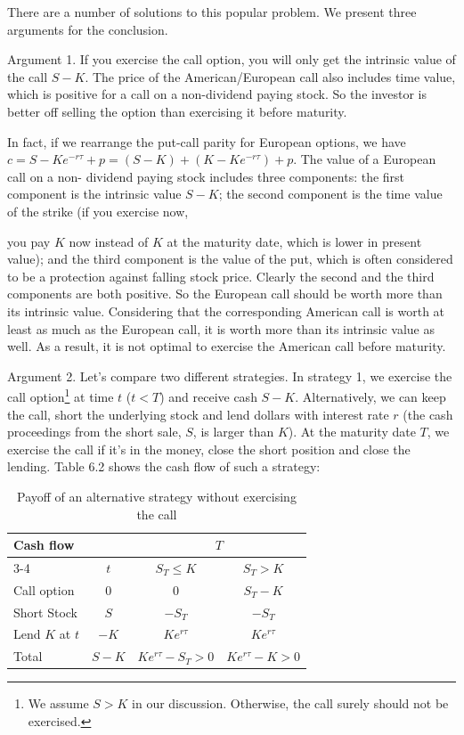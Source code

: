 \begin{solution}
There are a number of solutions to this popular problem. We present three arguments for
the conclusion.

Argument 1. If you exercise the call option, you will only get the intrinsic value of the
call $S-K$. The price of the American/European call also includes time value, which is
positive for a call on a non-dividend paying stock. So the investor is better off selling the
option than exercising it before maturity.

In fact, if we rearrange the put-call parity for European options, we have
$c=S-Ke^{-r\tau}+p=(S-K)+(K-Ke^{-r\tau})+p$. The value of a European call on a non-
dividend paying stock includes three components: the first component is the intrinsic
value $S-K$; the second component is the time value of the strike (if you exercise now,

you pay $K$ now instead of $K$ at the maturity date, which is lower in present value); and
the third component is the value of the put, which is often considered to be a protection
against falling stock price. Clearly the second and the third components are both positive.
So the European call should be worth more than its intrinsic value. Considering that the
corresponding American call is worth at least as much as the European call, it is worth
more than its intrinsic value as well. As a result, it is not optimal to exercise the American
call before maturity.

Argument 2. Let's compare two different strategies. In strategy 1, we exercise the call
option\footnote[4]{We assume $S>K$ in our discussion. Otherwise, the call surely should not
be exercised.} at time $t$ ($t<T$) and receive cash $S-K$. Alternatively, we can keep the call,
short the underlying stock and lend dollars with interest rate $r$ (the cash proceedings
from the short sale, $S$, is larger than $K$). At the maturity date $T$, we exercise the call if
it's in the money, close the short position and close the lending. Table 6.2 shows the cash
flow of such a strategy:

\begin{table}[H]
\centering
\small
\begin{tabular}{|l|c|c|c|}
\hline
Cash flow & & \multicolumn{2}{c|}{$T$} \\
\cline{3-4}
 & $t$ & $S_T\leq K$ & $S_T>K$ \\
\hline
Call option & $0$ & $0$ & $S_T-K$ \\
\hline
Short Stock & $S$ & $-S_T$ & $-S_T$ \\
\hline
Lend $K$ at $t$ & $-K$ & $Ke^{r\tau}$ & $Ke^{r\tau}$ \\
\hline
Total & $S-K$ & $Ke^{r\tau}-S_T>0$ & $Ke^{r\tau}-K>0$ \\
\hline
\end{tabular}
\caption{Payoff of an alternative strategy without exercising the call}
\label{tab:zhou-table-6-2}
\end{table}


\end{solution}
